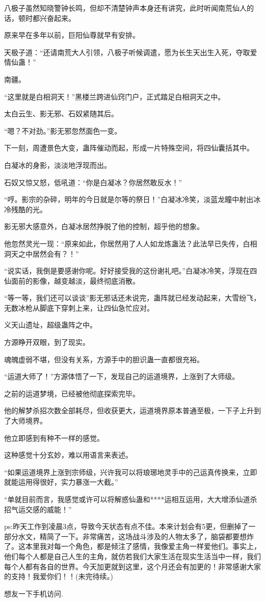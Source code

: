 \begin{this_body}
八极子虽然知晓警钟长鸣，但却不清楚钟声本身还有讲究，此时听闻南荒仙人的话，顿时都兴奋起来。

原来早在多年以前，巨阳仙尊就早有安排。

天极子道：“还请南荒大人引领，八极子听候调遣，愿为长生天出生入死，夺取爱情仙蛊！”

南疆。

“这里就是白相洞天！”黑楼兰跨进仙窍门户，正式踏足白相洞天之中。

太白云生、影无邪、石奴紧随其后。

“嗯？不对劲。”影无邪忽然面色一变。

下一刻，周遭景色大变，蛊阵催动而起，形成一片特殊空间，将四仙囊括其中。

白凝冰的身影，淡淡地浮现而出。

石奴又惊又怒，低吼道：“你是白凝冰？你居然敢反水！”

“哼。影宗的杂碎，明年的今日就是尔等的祭日！”白凝冰冷笑，淡蓝龙瞳中射出冰冷残酷的光。

影无邪大感意外，白凝冰居然挣脱了他的控制，超乎他的想象。

他忽然灵光一现：“原来如此，你居然用了人人如龙炼蛊法？此法早已失传，白相洞天之中居然会有？！”

“说实话，我倒是要感谢你呢。好好接受我的这份谢礼吧。”白凝冰冷笑，浮现在四仙面前的影像，越变越淡，最终彻底消散。

“等一等，我们还可以谈谈”影无邪话还未说完，蛊阵就已经发动起来，大雪纷飞，无数冰枪从脚底下穿刺上来，让四仙急忙应对。

义天山遗址，超级蛊阵之中。

方源睁开双眼，到了现实。

魂魄虚弱不堪，但没有关系，方源手中的胆识蛊一直都很充裕。

“运道大师了！”方源体悟了一下，发现自己的运道境界，上涨到了大师级。

之前的运道梦境，已经被他彻底探索完毕。

他的解梦杀招次数全部耗尽，但收获更大，运道境界原本普通至极，一下子上升到了大师境界。

他立即感到有种不一样的感觉。

这种感觉十分玄妙，难以用语言来表述。

“如果运道境界上涨到宗师级，兴许我可以将琅琊地灵手中的己运真传换来，立即就能运用得很好，实力暴涨一大截。”

“单就目前而言，我感觉或许可以将解惑仙蛊和****运相互运用，大大增添仙道杀招气运交感的威能！”

ps:昨天工作到凌晨3点，导致今天状态有点不佳。本来计划会有5更，但删掉了一部分水文，精简了一下。非常痛苦，这场战斗涉及的人物太多了，脑袋都要想炸了。这本里我对每一个角色，都是倾注了感情，我像爱主角一样爱他们。事实上，他们每个人都是自己人生的主角，就仿若我们大家生活在现实生活当中一样，我们每个人都有各自的世界。今天加更就到这里，这个月还会有加更的！非常感谢大家的支持！我爱你们！！(未完待续。)

想友一下手机访问.

\end{this_body}

